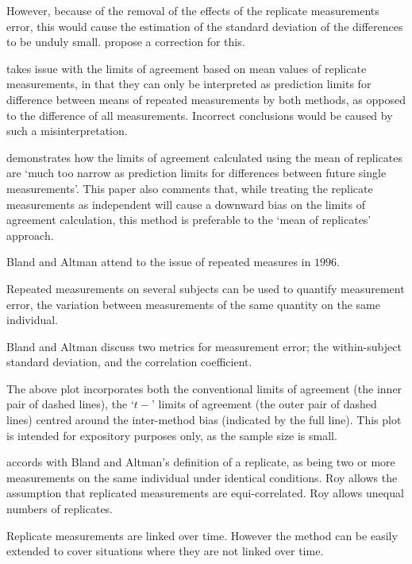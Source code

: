 \documentclass[12pt, a4paper]{report}
\theoremstyle{plain}
\theoremstyle{definition}
\theoremstyle{remark}
\begin{document}
	
	However, because of the removal of the effects of the replicate
	measurements error, this would cause the estimation of the
	standard deviation of the differences to be unduly small.
	\citet*{BA86} propose a correction for this.
	
	\citet{BXC2008} takes issue with the limits of agreement based on
	mean values of replicate measurements, in that they can only be interpreted as prediction
	limits for difference between means of repeated measurements by
	both methods, as opposed to the difference of all measurements.
	Incorrect conclusions would be caused by such a misinterpretation.
	
	\citet{BXC2008} demonstrates how the limits of agreement
	calculated using the mean of replicates are `much too narrow as
	prediction limits for differences between future single
	measurements'. This paper also comments that, while treating the
	replicate measurements as independent will cause a downward bias
	on the limits of agreement calculation, this method is preferable
	to the `mean of replicates' approach.

	Bland and Altman attend to the issue of repeated measures in
	$1996$.
	
	Repeated measurements on several subjects can be used to quantify
	measurement error, the variation between measurements of the same
	quantity on the same individual.
	
	Bland and Altman discuss two metrics for measurement error; the
	within-subject standard deviation, and the correlation
	coefficient.
	
	The above plot incorporates both the conventional limits of agreement (the inner pair of dashed lines), the `$t-$' limits of
	agreement (the outer pair of dashed lines) centred around the inter-method bias (indicated by the full line). This plot is
	intended for expository purposes only, as the sample size is small.
	
	\citet{ARoy2009} accords with Bland and Altman's definition of a replicate, as being two or more measurements on the same individual under identical conditions.
	Roy allows the assumption that replicated measurements are equi-correlated.
	Roy allows unequal numbers of replicates.
	
	
	Replicate measurements are linked over time. However the method can be easily extended to cover situations where they are not linked over time.
	
\end{document}
